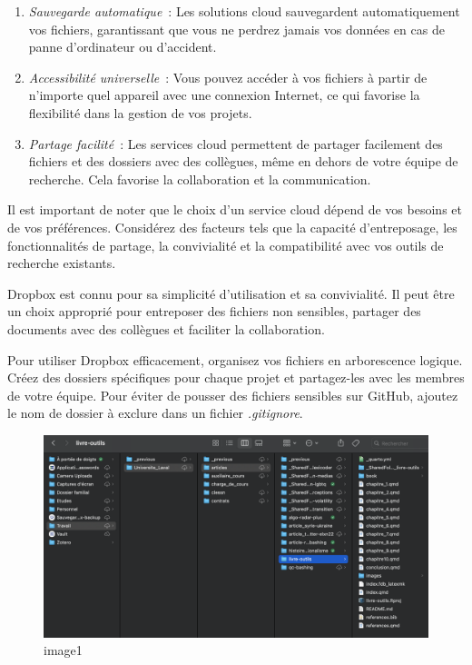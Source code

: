 \documentclass[
  letterpaper,
]{scrbook}
\begin{document}
\begin{enumerate}
\def\labelenumi{\arabic{enumi}.}
\item
  \emph{Sauvegarde automatique}~: Les solutions cloud sauvegardent
  automatiquement vos fichiers, garantissant que vous ne perdrez jamais
  vos données en cas de panne d'ordinateur ou d'accident.
\item
  \emph{Accessibilité universelle}~: Vous pouvez accéder à vos fichiers
  à partir de n'importe quel appareil avec une connexion Internet, ce
  qui favorise la flexibilité dans la gestion de vos projets.
\item
  \emph{Partage facilité}~: Les services cloud permettent de partager
  facilement des fichiers et des dossiers avec des collègues, même en
  dehors de votre équipe de recherche. Cela favorise la collaboration et
  la communication.
\end{enumerate}

Il est important de noter que le choix d'un service cloud dépend de vos
besoins et de vos préférences. Considérez des facteurs tels que la
capacité d'entreposage, les fonctionnalités de partage, la convivialité
et la compatibilité avec vos outils de recherche existants.

Dropbox est connu pour sa simplicité d'utilisation et sa convivialité.
Il peut être un choix approprié pour entreposer des fichiers non
sensibles, partager des documents avec des collègues et faciliter la
collaboration.

Pour utiliser Dropbox efficacement, organisez vos fichiers en
arborescence logique. Créez des dossiers spécifiques pour chaque projet
et partagez-les avec les membres de votre équipe. Pour éviter de pousser
des fichiers sensibles sur GitHub, ajoutez le nom de dossier à exclure
dans un fichier \emph{.gitignore}.

\begin{figure}

{\centering \includegraphics{images/chapitre8_2.png}

}

\caption{image1}

\end{figure}
\end{document}
